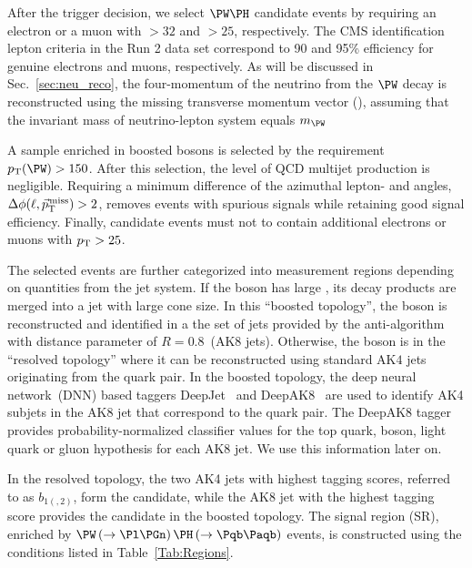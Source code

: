 \documentclass[a4paper,11pt]{article}
\newcommand{\Pb}{{{\Pqb}}\xspace}
\newcommand{\PAb}{{{{\Paqb}}}\xspace}
\begin{document}
After the trigger decision, we select $\PW\PH$ candidate events by requiring an electron or a muon with \pt$>32$ and $>25$\GeV, respectively. 
The CMS identification lepton criteria in the Run 2 data set correspond to 90 and 95\% efficiency for genuine electrons and muons, respectively. 
As will be discussed in Sec.~\ref{sec:neu_reco}, the four-momentum of the neutrino from the $\PW$ decay is reconstructed using the missing transverse momentum vector (\ptvecmiss), assuming that the invariant mass of neutrino-lepton system equals $m_{\PW}$ 

A sample enriched in boosted \PW bosons is selected by the requirement $\pt(\PW) > 150$\GeV. 
After this selection, the level of QCD multijet production is negligible.
Requiring a minimum difference of the azimuthal lepton- and \ptmiss angles, $\Delta\phi(\ell,{\vec p}_{\mathrm{T}}^{\kern1pt\text{miss}})>2$, removes events with spurious signals while retaining good signal efficiency.
Finally, \PW candidate events must not to contain additional electrons or muons with $p_{\mathrm{T}}>25$\GeV.

The selected events are further categorized into measurement regions depending on quantities from the jet system. 
If the \PH boson has large \pt, its decay products are merged into a jet with large cone size. 
In this ``boosted topology'', the \PH boson is reconstructed and identified in a the set of jets provided by the anti-\kt algorithm with distance parameter of $R=0.8$~(AK8 jets).
Otherwise, the \PH boson is in the ``resolved topology'' where it can be reconstructed using standard AK$4$ jets originating from the \Pb quark pair. 
In the boosted topology, the deep neural network~(DNN) based taggers DeepJet~\cite{Bols:2020bkb} and DeepAK8~\cite{Sirunyan:2020lcu} are used to identify AK4 subjets in the AK8 jet that correspond to the \Pb quark pair.
The DeepAK8 tagger provides probability-normalized classifier values for the top quark, \PW boson, light quark or gluon hypothesis for each AK8 jet. We use this information later on. %

In the resolved topology, the two AK4 jets with highest \Pb tagging scores, referred to as $b_{1(,2)}$, form the \PH candidate, while the AK8 jet with the highest \PH tagging score provides the \PH candidate in the boosted topology.
The signal region (SR), enriched by $\PW\left(\to \Pl \Pgn \right) \PH \left(\to \Pb \PAb \right)$ events, is constructed using the conditions listed in Table~\ref{Tab:Regions}.
\end{document}
